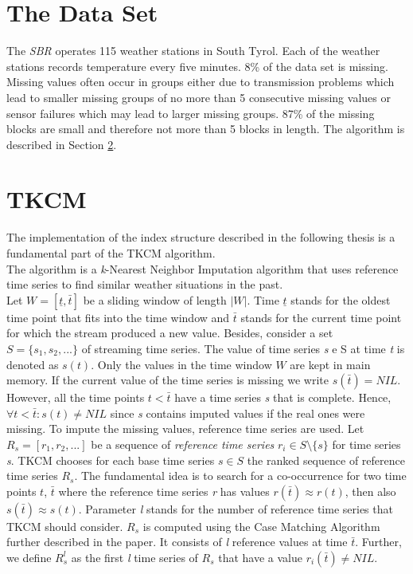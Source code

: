 \documentclass[abstracton,12pt]{scrreprt}
\begin{document}
\section{The Data Set}
\label{sec:DS}
The \emph{SBR} operates 115 weather stations in South Tyrol. Each of the weather stations records temperature every five minutes. 8\% of the data set is missing. Missing values often occur in groups either due to transmission problems which lead to smaller missing groups of no more than 5 consecutive missing values or sensor failures which may lead to larger missing groups. 87\% of the missing blocks are small and therefore not more than 5 blocks in length. The algorithm is described in Section \ref{sec:TKCM}. 


\section{TKCM}
\label{sec:TKCM}
The implementation of the index structure described in the following thesis is a fundamental part of the TKCM algorithm.\\
The algorithm is a \emph{k}-Nearest Neighbor Imputation algorithm that uses reference time series to find similar weather situations in the past. \\Let $W=[ \underline{t}, \bar{t} ]$ be a sliding window of length $|W|$. Time $\underline{t}$ stands for the oldest time point that fits into the time window and $\bar{t}$ stands for the current time point for which the stream produced a new value. Besides, consider a set $S = \{s_1,s_2,...\}$ of streaming time series. The value of time series \emph{s} e S at time \emph{t} is denoted as $s(t)$. Only the values in the time window $W$ are kept in main memory. If the current value of the time series is missing we write $s(\bar{t})=NIL$. However, all the time points $t < \bar{t}$ have a time series \emph{s} that is complete. Hence, $\forall t < \bar{t} : s(t) \ne NIL$ since \emph{s} contains imputed values if the real ones were missing. To impute the missing values, reference time series are used. Let $R_s = [r_1, r_2, ...]$ be a sequence of \emph{reference time series} $r_i \in S \setminus \{s\}$ for time series \emph{s}. TKCM chooses for each base time series $s \in S$ the ranked sequence of reference time series $R_s$. The fundamental idea is to search for a co-occurrence for two time points $t$, $\bar{t}$ where the reference time series \emph{r} has values $r(\bar{t})\approx r(t)$, then also $s(\bar{t}) \approx s(t)$. Parameter \emph{l} stands for the number of reference time series that TKCM should consider. $R_s$ is computed using the Case Matching Algorithm further described in the paper. It consists of \emph{l} reference values at time $\bar{t}$. Further, we define $R_s^l$ as the first \emph{l} time series of $R_s$ that have a value $r_i(\bar{t}) \ne NIL$. \\
\end{document}
